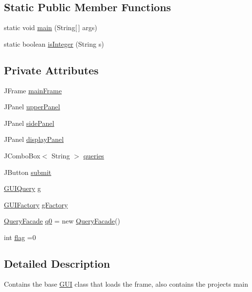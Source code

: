 \subsection*{Static Public Member Functions}
\begin{DoxyCompactItemize}
\item 
static void \hyperlink{classGUI_a8202c223d5b25c7dd94ce70bd6a267ac}{main} (String\mbox{[}$\,$\mbox{]} args)
\item 
static boolean \hyperlink{classGUI_a0ec9bf129676c56850ebc391c4c4b54e}{is\+Integer} (String s)
\end{DoxyCompactItemize}
\subsection*{Private Attributes}
\begin{DoxyCompactItemize}
\item 
J\+Frame \hyperlink{classGUI_ad0edd6841874d6f0d4d92b38fe4c58fa}{main\+Frame}
\item 
J\+Panel \hyperlink{classGUI_a5ae695a244b7bf0e35c5387063d0a6ae}{upper\+Panel}
\item 
J\+Panel \hyperlink{classGUI_a6930a3cfc244b0ce0d03e3fab60d33c7}{side\+Panel}
\item 
J\+Panel \hyperlink{classGUI_aa88e747a84e0e3b6ba35371f007c8151}{display\+Panel}
\item 
J\+Combo\+Box$<$ String $>$ \hyperlink{classGUI_ac15dd4c4cf3422b2e3ad7209b70b2df2}{queries}
\item 
J\+Button \hyperlink{classGUI_a4a469da0727abf52b86e23b12ca91fc6}{submit}
\item 
\hyperlink{classGUIQuery}{G\+U\+I\+Query} \hyperlink{classGUI_a267a714cad7b99c5f450e33e2bd91d0d}{g}
\item 
\hyperlink{classGUIFactory}{G\+U\+I\+Factory} \hyperlink{classGUI_ac95015c84714d8ba5c83e4a875466785}{g\+Factory}
\item 
\hyperlink{classQueryFacade}{Query\+Facade} \hyperlink{classGUI_a55cc973319a37d99e306b0c8cc665269}{q0} = new \hyperlink{classQueryFacade}{Query\+Facade}()
\item 
int \hyperlink{classGUI_a268ed195698683851c5ae951338182d1}{flag} =0
\end{DoxyCompactItemize}


\subsection{Detailed Description}
Contains the base \hyperlink{classGUI}{G\+UI} class that loads the frame, also contains the projects main 

